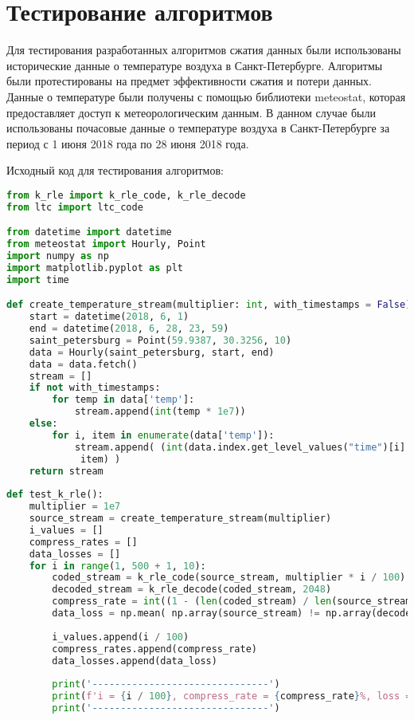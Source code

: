 \chapter{Тестирование алгоритмов}
Для тестирования разработанных алгоритмов сжатия данных были использованы исторические данные о температуре воздуха в Санкт-Петербурге. Алгоритмы были протестированы на предмет эффективности сжатия и потери данных.
Данные о температуре были получены с помощью библиотеки meteostat, которая предоставляет доступ к метеорологическим данным. В данном случае были использованы почасовые данные о температуре воздуха в Санкт-Петербурге за период с 1 июня 2018 года по 28 июня 2018 года.

Исходный код для тестирования алгоритмов:

\begin{lstlisting}[language=python, caption=Исходный код для тестирования алгоритмов, captionpos=b, frame=single]
from k_rle import k_rle_code, k_rle_decode
from ltc import ltc_code

from datetime import datetime
from meteostat import Hourly, Point
import numpy as np
import matplotlib.pyplot as plt
import time

def create_temperature_stream(multiplier: int, with_timestamps = False):
    start = datetime(2018, 6, 1)
    end = datetime(2018, 6, 28, 23, 59)
    saint_petersburg = Point(59.9387, 30.3256, 10) 
    data = Hourly(saint_petersburg, start, end)
    data = data.fetch()
    stream = []
    if not with_timestamps:
        for temp in data['temp']:
            stream.append(int(temp * 1e7))
    else:
        for i, item in enumerate(data['temp']):
            stream.append( (int(data.index.get_level_values("time")[i].timestamp()),
             item) )
    return stream
    
def test_k_rle():
    multiplier = 1e7
    source_stream = create_temperature_stream(multiplier)
    i_values = []
    compress_rates = []
    data_losses = []
    for i in range(1, 500 + 1, 10):
        coded_stream = k_rle_code(source_stream, multiplier * i / 100)
        decoded_stream = k_rle_decode(coded_stream, 2048)
        compress_rate = int((1 - (len(coded_stream) / len(source_stream))) * 100)
        data_loss = np.mean( np.array(source_stream) != np.array(decoded_stream) )*100
        
        i_values.append(i / 100)
        compress_rates.append(compress_rate)
        data_losses.append(data_loss)
        
        print('-------------------------------')
        print(f'i = {i / 100}, compress_rate = {compress_rate}%, loss = {data_loss}%')
        print('-------------------------------')
        

\end{lstlisting}
